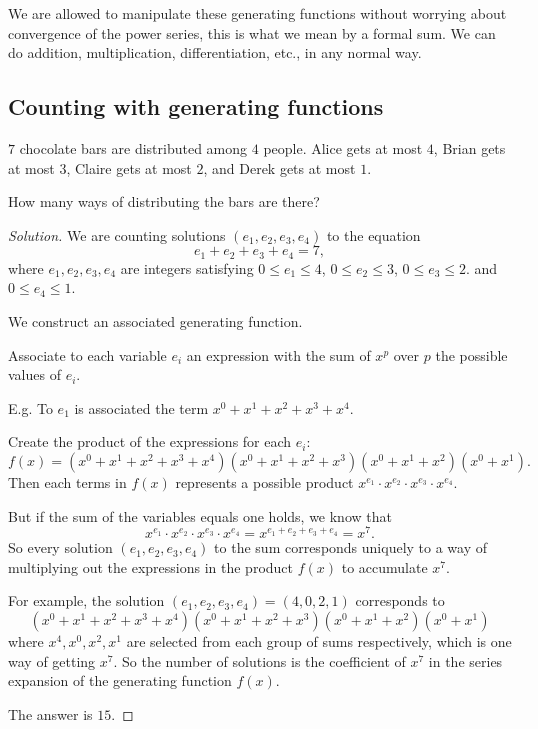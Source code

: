 \documentclass[10pt, a4paper]{article}
\begin{document}
We are allowed to manipulate these generating functions without worrying about convergence of the power series,
this is what we mean by a formal sum.
We can do addition, multiplication, differentiation, etc.,
in any normal way.

\subsection{Counting with generating functions}
\begin{example}
    $7$ chocolate bars are distributed among $4$ people.
    Alice gets at most $4$,
    Brian gets at most $3$,
    Claire gets at most $2$,
    and Derek gets at most $1$.

    How many ways of distributing the bars are there?
    \begin{proof}[Solution]\renewcommand{\qedsymbol}{}
        We are counting solutions $(e_1, e_2, e_3, e_4)$ to the equation
        \[
        e_1 + e_2 + e_3 + e_4 = 7,
        \]
        where $e_1, e_2, e_3, e_4$ are integers satisfying $0 \leq e_1 \leq 4$, $0 \leq e_2 \leq 3$, $0 \leq e_3 \leq 2$.
        and $0 \leq e_4 \leq 1$.
        
        We construct an associated generating function.

        Associate to each variable $e_i$ an expression with the sum of $x ^ p$ over $p$ the possible values of $e_i$.

        E.g. To $e_1$ is associated the term $x ^ 0 + x ^ 1 + x ^ 2 + x ^ 3 + x ^ 4$.

        Create the product of the expressions for each $e_i$:
        \[
        f(x) = (x ^ 0 + x ^ 1 + x ^ 2 + x ^ 3 + x ^ 4)(x ^ 0 + x ^ 1 + x ^ 2 + x ^ 3)(x ^ 0 + x ^ 1 + x ^ 2)(x ^ 0 + x ^ 1).
        \]
        Then each terms in $f(x)$ represents a possible product $x ^ {e_1} \cdot x ^ {e_2} \cdot x ^ {e_3} \cdot x ^ {e_4}$.
        
        But if the sum of the variables equals one holds,
        we know that
        \[
        x ^ {e_1} \cdot x ^ {e_2} \cdot x ^ {e_3} \cdot x ^ {e_4} = x ^ {e_1 + e_2 + e_3 + e_4} = x ^ 7.
        \]
        So every solution $(e_1, e_2, e_3, e_4)$ to the sum corresponds uniquely to a way of multiplying out the expressions in the product $f(x)$ to accumulate $x ^ 7$.

        For example,
        the solution $(e_1, e_2, e_3, e_4) = (4, 0, 2, 1)$ corresponds to
        \[
        (x ^ 0 + x ^ 1 + x ^ 2 + x ^ 3 + x ^ 4)(x ^ 0 + x ^ 1 + x ^ 2 + x ^ 3)(x ^ 0 + x ^ 1 + x ^ 2)(x ^ 0 + x ^ 1)
        \]
        where $x ^ 4, x ^ 0, x ^ 2, x ^ 1$ are selected from each group of sums respectively,
        which is one way of getting $x ^ 7$.
        So the number of solutions is the coefficient of $x ^ 7$ in the series expansion of the generating function $f(x)$.

        The answer is $15$.
    \end{proof}
\end{example}
\end{document}
